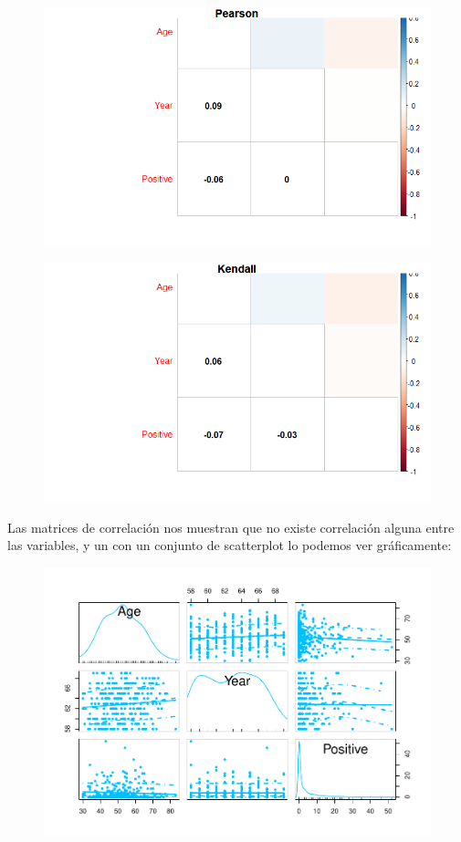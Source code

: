 \newpage

\begin{figure}[H]\includegraphics[width=\linewidth]{img/EDA2_files/corr1.png} \caption{}\end{figure}

\begin{figure}[H]\includegraphics[width=\linewidth]{img/EDA2_files/corr2.png} \caption{}\end{figure}

\newpage

Las matrices de correlación nos muestran que no existe correlación alguna entre las variables, y un con un conjunto de scatterplot lo podemos ver gráficamente:

\begin{figure}[H]\includegraphics[width=.9\linewidth]{img/EDA2_files/figure-latex/unnamed-chunk-28-1} \caption{}\end{figure}


